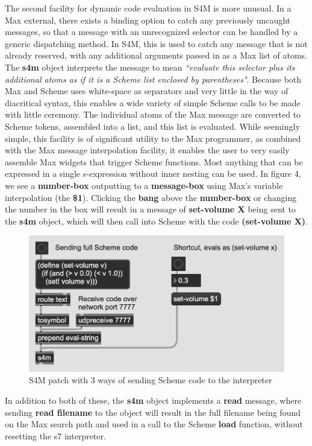 \documentclass[acmsmall]{acmart}
\begin{document}
The second facility for dynamic code evaluation in S4M is more unusual.
In a Max external, there exists a binding option to catch any previously
uncaught messages, so that a message with an unrecognized selector 
can be handled by a generic dispatching method. In S4M, this is used to 
catch any message that is not already reserved, with any additional 
arguments passed in as a Max list of atoms.  The \textbf{s4m} object interprets
the message to mean \textit{``evaluate this selector plus its additional atoms 
as if it is a Scheme list enclosed by parentheses"}.
Because both Max and Scheme uses white-space as separators and very little
in the way of diacritical syntax, this enables a wide variety
of simple Scheme calls to be made with little ceremony. The
individual atoms of the Max message are converted to Scheme tokens,
assembled into a list, and this list is evaluated. While seemingly simple,
this facility is of significant utility to the Max programmer, as combined
with the Max message interpolation facility, it enables the user to very
easily assemble Max widgets that trigger Scheme functions. Most anything that
can be expressed in a single s-expression without inner nesting can be used.
In figure 4, we see a \textbf{number-box} outputting to a \textbf{message-box} using Max's 
variable interpolation (the \textbf{\$1}). 
Clicking the \textbf{bang} above the \textbf{number-box} or changing the number in 
the box will result in a message of 
\textbf{set-volume X} being sent to the \textbf{s4m} object, which will then call
into Scheme with the code \textbf{(set-volume X)}.

\begin{figure}[H]
  \centering
  \includegraphics[width=.75\linewidth]{fig-4-code-sends}
  \caption{S4M patch with 3 ways of sending Scheme code to the interpreter}
\end{figure}


In addition to both of these, the \textbf{s4m} object implements a \textbf{read} message,
where sending \textbf{read filename} to the object will result in the full filename
being found on the Max search path and used in a call to the Scheme \textbf{load} function,
without resetting the s7 interpreter.
\end{document}
